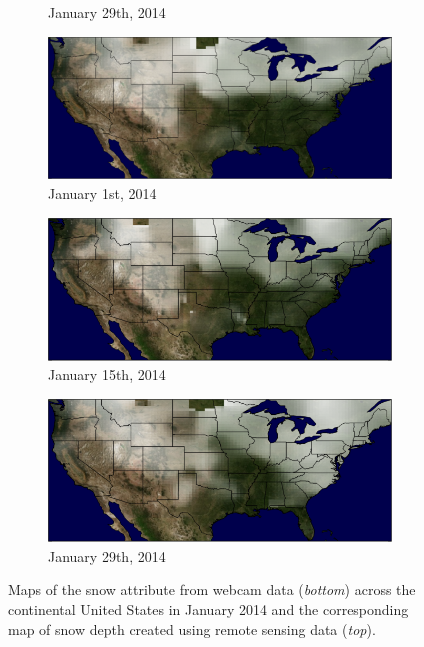 \documentclass[10pt,twocolumn,letterpaper]{article}
\begin{document}
\begin{figure}
\begin{subfigure}[b]{0.33\textwidth}
    \caption{January 29th, 2014}
    \label{fig:snow_map_gt_3}
  \end{subfigure}
  \begin{subfigure}[b]{0.33\textwidth}
    \centering
		\includegraphics[width=\textwidth, trim= 0mm 0mm 0mm 0mm]{figs/snow_map_1.png}
    \caption{January 1st, 2014}
    \label{fig:snow_map_est_1}
  \end{subfigure}
  \begin{subfigure}[b]{0.33\textwidth}
    \centering
		\includegraphics[width=\textwidth, trim= 0mm 0mm 0mm 0mm]{figs/snow_map_2.png}
    \caption{January 15th, 2014}
    \label{fig:snow_map_est_2}
  \end{subfigure}
  \begin{subfigure}[b]{0.33\textwidth}
    \centering
		\includegraphics[width=\textwidth, trim= 0mm 0mm 0mm 0mm]{figs/snow_map_3.png}
    \caption{January 29th, 2014}
    \label{fig:snow_map_est_3}
  \end{subfigure}
  \caption{Maps of the snow attribute from webcam data (\emph{bottom})
           across the continental United States in January 2014 and the
           corresponding map of snow depth created using remote 
           sensing data (\emph{top}).\protect\footnotemark} 
  \label{fig:snow_maps}
\end{figure}
\end{document}
